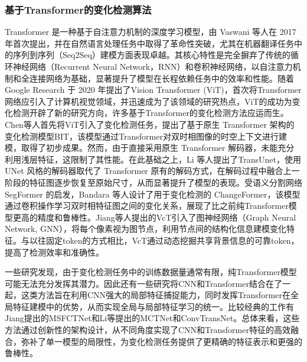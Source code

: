 \documentclass[lang=chs, degree=master, blindreview=false, adobe=false]{yanputhesis}
\begin{document}
\subsubsection{基于Transformer的变化检测算法}
Transformer 是一种基于自注意力机制的深度学习模型，由 Vaswani 等人\cite{vaswani2017transformer}在 2017 年首次提出，并在自然语言处理任务中取得了革命性突破，尤其在机器翻译任务中的序列到序列（Seq2Seq）建模方面表现卓越。其核心特性是完全摒弃了传统的循环神经网络\cite{zaremba2014rnn}（Recurrent Neural Network，RNN）和卷积神经网络，以自注意力机制和全连接网络为基础，显著提升了模型在长程依赖任务中的效率和性能。随着Google Research 于 2020 年提出了Vision Transformer (ViT)\cite{dosovitskiy2020vit}，首次将Transformer网络应引入了计算机视觉领域，并迅速成为了该领域的研究热点，ViT的成功为变化检测开辟了新的研究方向，许多基于Transformer的变化检测方法应运而生。Chen等人首先将ViT引入了变化检测任务，提出了基于原生 Transformer 架构的变化检测模型BIT\cite{chen2021BIT}，该模型通过Transformer对双时相图像的时空上下文进行建模，取得了初步成果。然而，由于直接采用原生 Transformer 解码器，未能充分利用浅层特征，这限制了其性能。在此基础之上，Li 等人提出了TransUnet\cite{li2022transunetcd}，使用UNet 风格的解码器取代了 Transformer 原有的解码方式，在解码过程中融合上一阶段的特征图逐步恢复至原始尺寸，从而显著提升了模型的表现。受语义分割网络SegFormer \cite{xie2021segformer}的启发，Bandara 等人设计了用于变化检测的 ChangeFormer\cite{bandara2022transformer}，该模型通过卷积操作学习双时相特征图之间的变化关系，展现了比之前纯Transformer模型更高的精度和鲁棒性。Jiang等人提出的VcT\cite{jiang2023vct}引入了图神经网络（Graph Neural Network, GNN），将每个像素视为图节点，利用节点间的结构化信息建模变化特征。与以往固定token的方式相比，VcT通过动态挖掘共享背景信息的可靠token，提高了检测效率和准确性。

一些研究发现，由于变化检测任务中的训练数据量通常有限，纯Transformer模型可能无法充分发挥其潜力。因此还有一些研究将CNN和Transformer结合在了一起，这类方法旨在利用CNN强大的局部特征捕捉能力，同时发挥Transformer在全局特征建模中的优势，从而实现全局与局部特征学习的统一。比较经典的工作有Jiang提出的MSFCTNet\cite{jiang2024cnntranscd}和Li等提出的MCTNet\cite{lwm2023cnntransCD2}和ConvTransNet\cite{lwm2023cnntransCD}。总体来看，这些方法通过创新性的架构设计，从不同角度实现了CNN和Transformer特征的高效融合，弥补了单一模型的局限性，为变化检测任务提供了更精确的特征表示和更强的鲁棒性。
\end{document}
